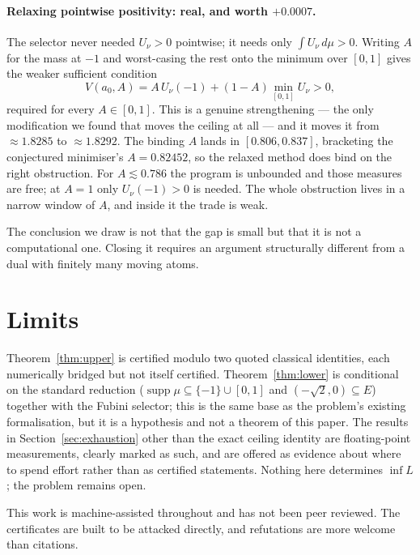 \documentclass[11pt]{article}
\newcommand{\supp}{\operatorname{supp}}
\begin{document}
\paragraph{Relaxing pointwise positivity: real, and worth $+0.0007$.}
The selector never needed $U_\nu>0$ pointwise; it needs only $\int
U_\nu\,d\mu>0$. Writing $A$ for the mass at $-1$ and worst-casing the
rest onto the minimum over $[0,1]$ gives the weaker sufficient condition
\[
  V(a_0,A)=A\,U_\nu(-1)+(1-A)\min_{[0,1]}U_\nu>0 ,
\]
required for every $A\in[0,1]$. This is a genuine strengthening --- the
only modification we found that moves the ceiling at all --- and it
moves it from $\approx1.8285$ to $\approx1.8292$. The binding $A$ lands
in $[0.806,0.837]$, bracketing the conjectured minimiser's
$A=0.82452$, so the relaxed method does bind on the right obstruction.
For $A\lesssim0.786$ the program is unbounded and those measures are
free; at $A=1$ only $U_\nu(-1)>0$ is needed. The whole obstruction lives
in a narrow window of $A$, and inside it the trade is weak.

\medskip

The conclusion we draw is not that the gap is small but that it is not a
computational one. Closing it requires an argument structurally
different from a dual with finitely many moving atoms.

\section{Limits}

Theorem~\ref{thm:upper} is certified modulo two quoted classical
identities, each numerically bridged but not itself certified.
Theorem~\ref{thm:lower} is conditional on the standard reduction
($\supp\mu\subseteq\{-1\}\cup[0,1]$ and $(-\sqrt2,0)\subseteq E$)
together with the Fubini selector; this is the same base as the
problem's existing formalisation, but it is a hypothesis and not a
theorem of this paper. The results in
Section~\ref{sec:exhaustion} other than the exact ceiling identity are
floating-point measurements, clearly marked as such, and are offered as
evidence about where to spend effort rather than as certified
statements. Nothing here determines $\inf L$; the problem remains open.

This work is machine-assisted throughout and has not been peer reviewed.
The certificates are built to be attacked directly, and refutations are
more welcome than citations.
\end{document}
